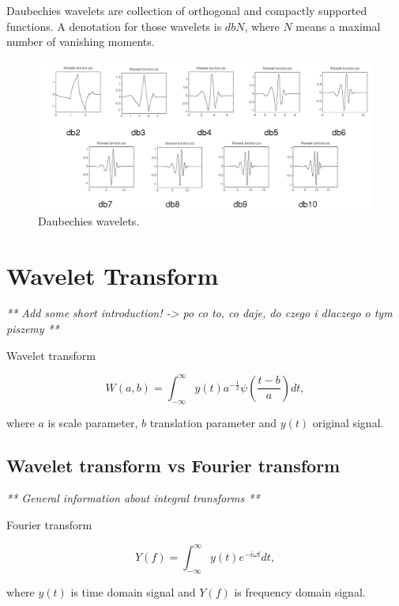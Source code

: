 \begin{defn}
Daubechies wavelets are collection of orthogonal and compactly supported functions. A denotation for those wavelets is $dbN$, where $N$ means a maximal number of vanishing moments.
\end{defn}

\begin{figure}[h]
	\centering
	\includegraphics[width=\textwidth]{DB_N.png}
	\caption{Daubechies wavelets.}
	\label{fig:db_wavelets}
\end{figure}

\section{Wavelet Transform}

\textit{** Add some short introduction! -> po co to, co daje, do czego i dlaczego o tym piszemy  **}

\begin{defn}
Wavelet transform

\begin{equation}
W(a,b)=\int_{-\infty}^{\infty} y(t) a^{-\frac{1}{2}} \psi\left(\frac{t-b}{a}\right) dt,
\end{equation}

where $a$ is scale parameter, $b$ translation parameter and $y(t)$ original signal.
\end{defn}

\subsection{Wavelet transform vs Fourier transform}

\textit{** General information about integral transforms  **}

\begin{defn}
Fourier transform

\begin{equation}
Y(f)=\int_{-\infty}^{\infty} y(t) e^{-i\omega t} dt,
\end{equation}

where $y(t)$ is time domain signal and $Y(f)$ is frequency domain signal.
\end{defn}

